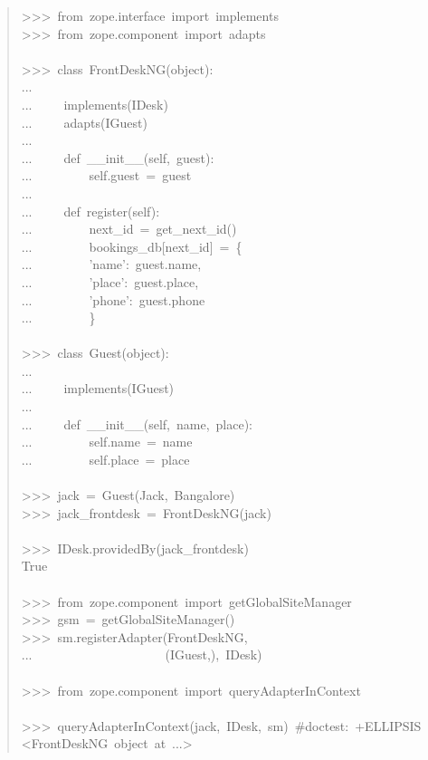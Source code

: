 \documentclass[a4paper,openany,twoside,final]{book}
\begin{document}
\begin{quote}
{>{}>{}>~from~zope.interface~import~implements\\
>{}>{}>~from~zope.component~import~adapts\\
~\\
>{}>{}>~class~FrontDeskNG(object):\\
...\\
...~~~~~implements(IDesk)\\
...~~~~~adapts(IGuest)\\
...\\
...~~~~~def~\_\_init\_\_(self,~guest):\\
...~~~~~~~~~self.guest~=~guest\\
...\\
...~~~~~def~register(self):\\
...~~~~~~~~~next\_id~=~get\_next\_id()\\
...~~~~~~~~~bookings\_db{[}next\_id{]}~=~\{\\
...~~~~~~~~~'name':~guest.name,\\
...~~~~~~~~~'place':~guest.place,\\
...~~~~~~~~~'phone':~guest.phone\\
...~~~~~~~~~\}\\
~\\
>{}>{}>~class~Guest(object):\\
...\\
...~~~~~implements(IGuest)\\
...\\
...~~~~~def~\_\_init\_\_(self,~name,~place):\\
...~~~~~~~~~self.name~=~name\\
...~~~~~~~~~self.place~=~place\\
~\\
>{}>{}>~jack~=~Guest(\textquotedbl{}Jack\textquotedbl{},~\textquotedbl{}Bangalore\textquotedbl{})\\
>{}>{}>~jack\_frontdesk~=~FrontDeskNG(jack)\\
~\\
>{}>{}>~IDesk.providedBy(jack\_frontdesk)\\
True\\
~\\
>{}>{}>~from~zope.component~import~getGlobalSiteManager\\
>{}>{}>~gsm~=~getGlobalSiteManager()\\
>{}>{}>~sm.registerAdapter(FrontDeskNG,\\
...~~~~~~~~~~~~~~~~~~~~~(IGuest,),~IDesk)\\
~\\
>{}>{}>~from~zope.component~import~queryAdapterInContext\\
~\\
>{}>{}>~queryAdapterInContext(jack,~IDesk,~sm)~\#doctest:~+ELLIPSIS\\
<FrontDeskNG~object~at~...>
}
\end{quote}
\end{document}
